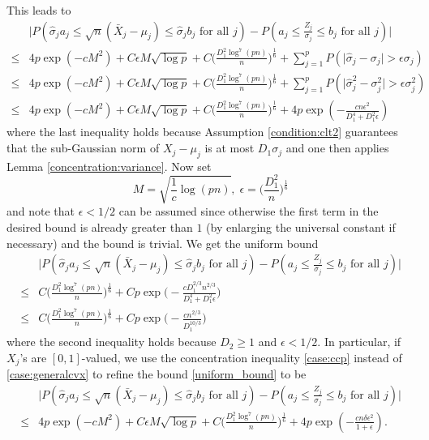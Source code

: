 \documentclass[mnsc,blindrev]{informs4} %
\begin{document}
This leads to
\begin{align}
\nonumber&\big\lvert P(\hat\sigma_ja_j\leq \sqrt n(\bar{X}_j-\mu_j)\leq\hat\sigma_j b_j\text{ for all }j)-P(a_j\leq \frac{Z_j}{\sigma_j}\leq b_j\text{ for all }j)\big\rvert\\
\nonumber\leq&4p\exp(-cM^2)+C\epsilon M\sqrt{\log p}+C\Big(\frac{D_1^2\log^7(pn)}{n}\Big)^{\frac{1}{6}}+\sum_{j=1}^pP(\big\lvert\hat\sigma_j-\sigma_j\big\rvert> \epsilon\sigma_j)\\
\nonumber\leq&4p\exp(-cM^2)+C\epsilon M\sqrt{\log p}+C\Big(\frac{D_1^2\log^7(pn)}{n}\Big)^{\frac{1}{6}}+\sum_{j=1}^pP(\big\lvert\hat\sigma^2_j-\sigma^2_j\big\rvert>\epsilon\sigma^2_j)\\
\leq&4p\exp(-cM^2)+C\epsilon M\sqrt{\log p}+C\Big(\frac{D_1^2\log^7(pn)}{n}\Big)^{\frac{1}{6}}+4p\exp(-\frac{cn\epsilon^2}{D_1^4+D_1^2\epsilon})\label{uniform_bound}
\end{align}
where the last inequality holds because Assumption \ref{condition:clt2} guarantees that the sub-Gaussian norm of $X_j-\mu_j$ is at most $D_1\sigma_j$ and one then applies Lemma \ref{concentration:variance}. Now set
\begin{equation*}
M=\sqrt{\frac{1}{c}\log(pn)},\;\epsilon=\Big(\frac{D_1^2}{n}\Big)^{\frac{1}{6}}
\end{equation*}
and note that $\epsilon< 1/2$ can be assumed since otherwise the first term in the desired bound is already greater than $1$ (by enlarging the universal constant if necessary) and the bound is trivial. We get the uniform bound
\begin{align*}
&\big\lvert P(\hat\sigma_ja_j\leq \sqrt n(\bar{X}_j-\mu_j)\leq\hat\sigma_j b_j\text{ for all }j)-P(a_j\leq \frac{Z_j}{\sigma_j}\leq b_j\text{ for all }j)\big\rvert\\
\leq &C\Big(\frac{D_1^2\log^7(pn)}{n}\Big)^{\frac{1}{6}}+Cp\exp\Big(-\frac{cD_1^{2/3}n^{2/3}}{D_1^4+D_1^2\epsilon}\Big)\\
\leq &C\Big(\frac{D_1^2\log^7(pn)}{n}\Big)^{\frac{1}{6}}+Cp\exp\Big(-\frac{cn^{2/3}}{D_1^{10/3}}\Big)
\end{align*}
where the second inequality holds because $D_2\geq 1$ and $\epsilon< 1/2$. In particular, if $X_j$'s are $[0,1]$-valued, we use the concentration inequality \eqref{case:ccp} instead of \eqref{case:generalcvx} to refine the bound \eqref{uniform_bound} to be
\begin{align*}
&\big\lvert P(\hat\sigma_ja_j\leq \sqrt n(\bar{X}_j-\mu_j)\leq\hat\sigma_j b_j\text{ for all }j)-P(a_j\leq \frac{Z_j}{\sigma_j}\leq b_j\text{ for all }j)\big\rvert\\
\leq&4p\exp(-cM^2)+C\epsilon M\sqrt{\log p}+C\Big(\frac{D_1^2\log^7(pn)}{n}\Big)^{\frac{1}{6}}+4p\exp(-\frac{cn\delta\epsilon^2}{1+\epsilon}).
\end{align*}
\end{document}
